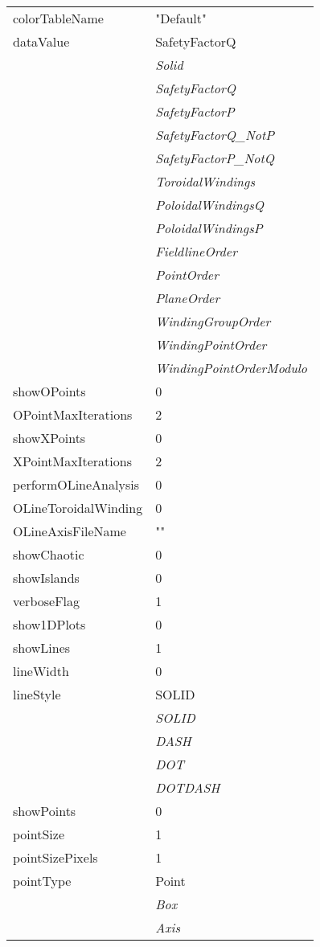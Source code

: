 \documentclass[10pt,a4paper]{report}
\begin{document}
\begin{longtable}{ll}
colorTableName  &  "Default" \\
dataValue  &  SafetyFactorQ   \\
 & {\it  Solid} \\
 & {\it  SafetyFactorQ} \\
 & {\it  SafetyFactorP} \\
 & {\it  SafetyFactorQ\_NotP} \\
 & {\it  SafetyFactorP\_NotQ} \\
 & {\it  ToroidalWindings} \\
 & {\it  PoloidalWindingsQ} \\
 & {\it  PoloidalWindingsP} \\
 & {\it  FieldlineOrder} \\
 & {\it  PointOrder} \\
 & {\it  PlaneOrder} \\
 & {\it  WindingGroupOrder} \\
 & {\it  WindingPointOrder} \\
 & {\it  WindingPointOrderModulo} \\
showOPoints  &  0 \\
OPointMaxIterations  &  2 \\
showXPoints  &  0 \\
XPointMaxIterations  &  2 \\
performOLineAnalysis  &  0 \\
OLineToroidalWinding  &  0 \\
OLineAxisFileName  &  "" \\
showChaotic  &  0 \\
showIslands  &  0 \\
verboseFlag  &  1 \\
show1DPlots  &  0 \\
showLines  &  1 \\
lineWidth  &  0 \\
lineStyle  &  SOLID   \\
 & {\it  SOLID} \\
 & {\it  DASH} \\
 & {\it  DOT} \\
 & {\it  DOTDASH} \\
showPoints  &  0 \\
pointSize  &  1 \\
pointSizePixels  &  1 \\
pointType  &  Point   \\
 & {\it  Box} \\
 & {\it  Axis} \\

\end{longtable}
\end{document}
